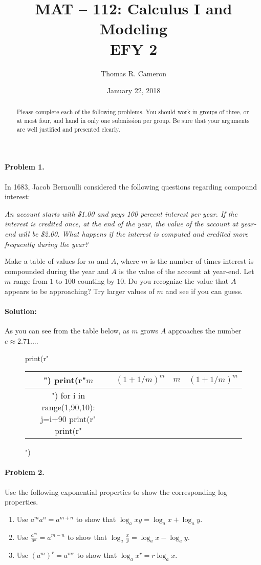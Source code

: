 \documentclass{article}
\title{MAT -- 112: Calculus I and Modeling\\
\large{EFY 2}}
\author{Thomas R. Cameron}
\date{January 22, 2018}
\begin{document}
\maketitle

\begin{abstract}
Please complete each of the following problems. You should work in groups of three, or at most four, and hand in only one submission per group. Be sure that your arguments are well justified and presented clearly. 
\end{abstract}

\paragraph*{Problem 1.}	In 1683, Jacob Bernoulli considered the following questions regarding compound interest:
\begin{center}
\emph{An account starts with \$1.00 and pays 100 percent interest per year. If the interest is credited once, at the end of the year, the value of the account at year-end will be \$2.00. What happens if the interest is computed and credited more frequently during the year?}
\end{center}
Make a table of values for $m$ and $A$, where $m$ is the number of times interest is compounded during the year and $A$ is the value of the account at year-end. Let $m$ range from  $1$ to $100$ counting by $10$. Do you recognize the value that $A$ appears to be approaching? Try larger values of $m$ and see if you can guess.

\paragraph*{Solution:}	As you can see from the table below, as $m$ grows $A$ approaches the number $e\approx 2.71...$.
\begin{figure}[h]
\centering
\begin{pycode}
print(r"\begin{tabular}{c | c | c | c}")
print(r"$m$ & $(1+1/m)^{m}$ & $m$ & $(1+1/m)^{m}$ \\ \hline")
for i in range(1,90,10):
	j=i+90
	print(r"%
print(r"\end{tabular}")
\end{pycode}
\end{figure}

\paragraph*{Problem 2.}	Use the following exponential properties to show the corresponding log properties.
\begin{enumerate}
\item	Use $a^{m}a^{n}=a^{m+n}$ to show that $\log_{a}xy=\log_{a}x + \log_{a}y$.
\item	Use $\frac{a^{m}}{a^{n}}=a^{m-n}$ to show that $\log_{a}\frac{x}{y}=\log_{a}x-\log_{a}y$.
\item	Use $\left(a^{m}\right)^{r}=a^{mr}$ to show that $\log_{a}{x^{r}}=r\log_{a}x$.
\end{enumerate}
\end{document}
